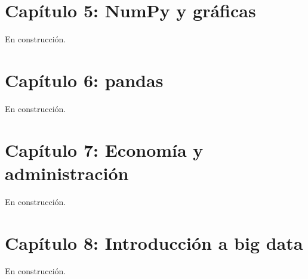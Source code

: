 \documentclass[
  spanish,
  letterpaper,
  DIV=11,
  numbers=noendperiod]{scrreprt}
\begin{document}

\chapter{Capítulo 5: NumPy y
gráficas}\label{capuxedtulo-5-numpy-y-gruxe1ficas}

En construcción.


\chapter{Capítulo 6: pandas}\label{capuxedtulo-6-pandas}

En construcción.


\chapter{Capítulo 7: Economía y
administración}\label{capuxedtulo-7-economuxeda-y-administraciuxf3n}

En construcción.


\chapter{Capítulo 8: Introducción a big
data}\label{capuxedtulo-8-introducciuxf3n-a-big-data}

En construcción.
\end{document}
